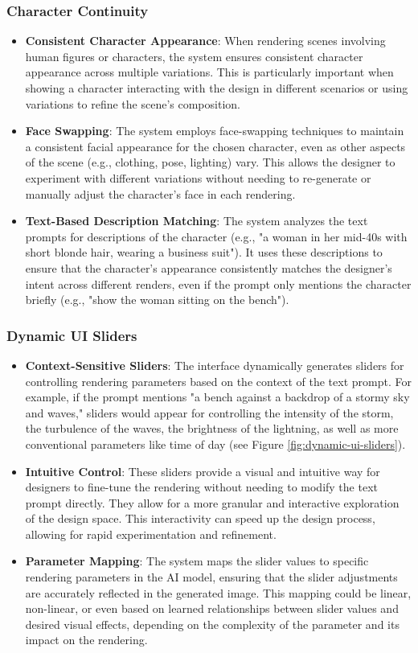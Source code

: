 \documentclass{article}
\begin{document}
\subsubsection{Character Continuity}
\begin{itemize}
\item \textbf{Consistent Character Appearance}: When rendering scenes involving human figures or characters, the system ensures consistent character appearance across multiple variations. This is particularly important when showing a character interacting with the design in different scenarios or using variations to refine the scene's composition.
\item \textbf{Face Swapping}: The system employs face-swapping techniques to maintain a consistent facial appearance for the chosen character, even as other aspects of the scene (e.g., clothing, pose, lighting) vary. This allows the designer to experiment with different variations without needing to re-generate or manually adjust the character's face in each rendering.
\item \textbf{Text-Based Description Matching}: The system analyzes the text prompts for descriptions of the character (e.g., "a woman in her mid-40s with short blonde hair, wearing a business suit"). It uses these descriptions to ensure that the character's appearance consistently matches the designer's intent across different renders, even if the prompt only mentions the character briefly (e.g., "show the woman sitting on the bench").
\end{itemize}

\subsubsection{Dynamic UI Sliders}
\begin{itemize}
\item \textbf{Context-Sensitive Sliders}: The interface dynamically generates sliders for controlling rendering parameters based on the context of the text prompt. For example, if the prompt mentions "a bench against a backdrop of a stormy sky and waves," sliders would appear for controlling the intensity of the storm, the turbulence of the waves, the brightness of the lightning, as well as more conventional parameters like time of day (see Figure \ref{fig:dynamic-ui-sliders}).
\item \textbf{Intuitive Control}: These sliders provide a visual and intuitive way for designers to fine-tune the rendering without needing to modify the text prompt directly. They allow for a more granular and interactive exploration of the design space. This interactivity can speed up the design process, allowing for rapid experimentation and refinement.
\item \textbf{Parameter Mapping}: The system maps the slider values to specific rendering parameters in the AI model, ensuring that the slider adjustments are accurately reflected in the generated image. This mapping could be linear, non-linear, or even based on learned relationships between slider values and desired visual effects, depending on the complexity of the parameter and its impact on the rendering.
\end{itemize}
\end{document}

